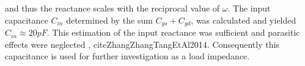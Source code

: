 and thus the reactance scales with the reciprocal value of $\omega$.
The input capacitance $C_{in}$ determined by the sum $C_{gs} + C_{gd}$, was calculated and yielded $C_{in}\approx 20 pF$.
This estimation of the input reactance was sufficient and parasitic effects were neglected \cite{CakaZabelliLimaniEtAl2007}, cite{ZhangZhangTangEtAl2014}.
Consequently this capacitance is used for further investigation as a load impedance.
%
%
%


